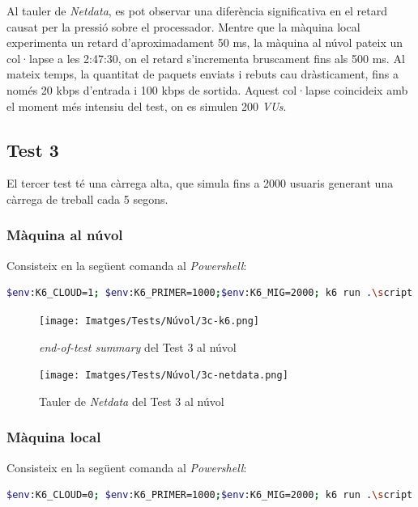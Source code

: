 Al tauler de \textit{Netdata}, es pot observar una diferència significativa en el retard causat per la pressió sobre el processador. Mentre que la màquina local experimenta un retard d'aproximadament 50 ms, la màquina al núvol pateix un col·lapse a les 2:47:30, on el retard s'incrementa bruscament fins als 500 ms. Al mateix temps, la quantitat de paquets enviats i rebuts cau dràsticament, fins a només 20 kbps d'entrada i 100 kbps de sortida. Aquest col·lapse coincideix amb el moment més intensiu del test, on es simulen 200 \textit{VUs}.

\newpage
\subsection{Test 3}

El tercer test té una càrrega alta, que simula fins a 2000 usuaris generant una càrrega de treball cada 5 segons.

\subsubsection{Màquina al núvol}
Consisteix en la següent comanda al \textit{Powershell}:
\begin{lstlisting}[language=bash, caption=Test 3 al núvol]
    $env:K6_CLOUD=1; $env:K6_PRIMER=1000;$env:K6_MIG=2000; k6 run .\script.js
\end{lstlisting}

\begin{figure}[!htbp]
    \texttt{[image: Imatges/Tests/Núvol/3c-k6.png]}  
    \caption{\textit{end-of-test summary} del Test 3 al núvol}
\end{figure}

\begin{figure}[!htbp]
    \texttt{[image: Imatges/Tests/Núvol/3c-netdata.png]}  
    \caption{Tauler de \textit{Netdata} del Test 3 al núvol}
\end{figure}

\subsubsection{Màquina local}
Consisteix en la següent comanda al \textit{Powershell}:
\begin{lstlisting}[language=bash, caption=Test 3 local]
    $env:K6_CLOUD=0; $env:K6_PRIMER=1000;$env:K6_MIG=2000; k6 run .\script.js
\end{lstlisting}

